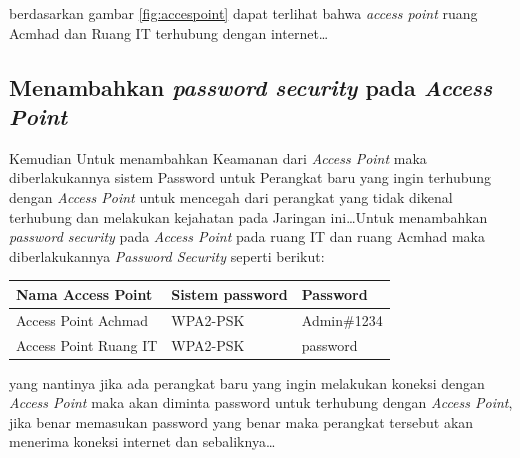 \documentclass[a4paper, 12pt]{article}
\begin{document}
berdasarkan gambar \ref{fig:accespoint} dapat terlihat bahwa \textit{access point} ruang Acmhad dan Ruang IT terhubung dengan internet\dots
\subsection{Menambahkan \textit{password security} pada \textit{Access Point}}
Kemudian Untuk menambahkan Keamanan dari \textit{Access Point} maka diberlakukannya sistem Password untuk Perangkat baru yang ingin terhubung dengan \textit{Access Point} untuk mencegah dari perangkat yang tidak dikenal terhubung dan melakukan kejahatan pada Jaringan ini\dots Untuk menambahkan \textit{password security} pada \textit{Access Point} pada ruang IT dan ruang Acmhad maka diberlakukannya \textit{Password Security} seperti berikut:
\begin{table}[H]
  \centering
  \begin{tabular}{|l|l|l|}
    \hline
    Nama Access Point     & Sistem password & Password    \\ \hline
    Access Point Achmad  & WPA2-PSK        & Admin\#1234 \\ \hline
    Access Point Ruang IT & WPA2-PSK        & password    \\ \hline
  \end{tabular}
\end{table}
yang nantinya jika ada perangkat baru yang ingin melakukan koneksi dengan \textit{Access Point} maka akan diminta password untuk terhubung dengan \textit{Access Point}, jika benar memasukan password yang benar maka perangkat tersebut akan menerima koneksi internet dan sebaliknya\dots
\end{document}
